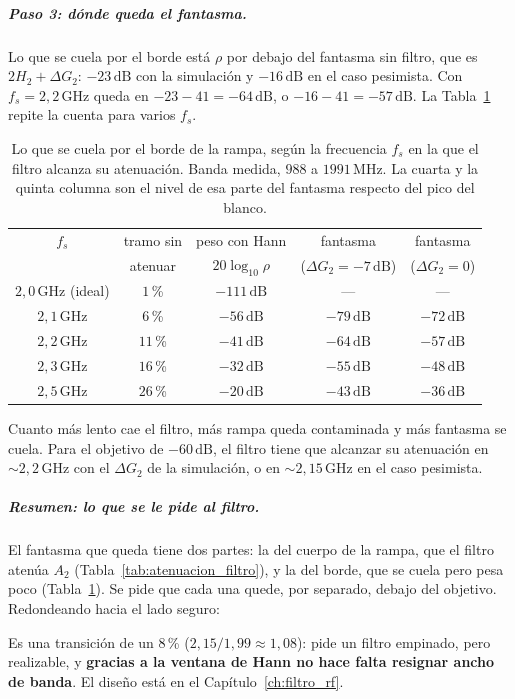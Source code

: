 \documentclass[12pt, a4paper, twoside]{report}
\begin{document}
\subparagraph{Paso 3: dónde queda el fantasma.} Lo que se cuela por el
borde está $\rho$ por debajo del fantasma sin filtro, que es $2H_2 + \Delta
G_2$: $-23\,\text{dB}$ con la simulación y $-16\,\text{dB}$ en el caso
pesimista. Con $f_s = 2{,}2\,\text{GHz}$ queda en
$-23 - 41 = -64\,\text{dB}$, o $-16 - 41 = -57\,\text{dB}$. La
Tabla~\ref{tab:filtro_transicion} repite la cuenta para varios $f_s$.

\begin{table}[H]
  \centering
  \caption{Lo que se cuela por el borde de la rampa, según la frecuencia
  $f_s$ en la que el filtro alcanza su atenuación. Banda medida, $988$ a
  $1991\,\text{MHz}$. La cuarta y la quinta columna son el nivel de esa parte
  del fantasma respecto del pico del blanco.}
  \label{tab:filtro_transicion}
  \begin{tabular}{ccccc}
    \toprule
    $f_s$ & tramo sin & peso con Hann & fantasma & fantasma \\
    & atenuar & $20\log_{10}\rho$ & ($\Delta G_2 = -7\,\text{dB}$)
      & ($\Delta G_2 = 0$) \\
    \midrule
    $2{,}0\,\text{GHz}$ (ideal) & $1$\,\% & $-111\,\text{dB}$ & ---
      & --- \\
    $2{,}1\,\text{GHz}$ & $6$\,\%  & $-56\,\text{dB}$ & $-79\,\text{dB}$
      & $-72\,\text{dB}$ \\
    $2{,}2\,\text{GHz}$ & $11$\,\% & $-41\,\text{dB}$ & $-64\,\text{dB}$
      & $-57\,\text{dB}$ \\
    $2{,}3\,\text{GHz}$ & $16$\,\% & $-32\,\text{dB}$ & $-55\,\text{dB}$
      & $-48\,\text{dB}$ \\
    $2{,}5\,\text{GHz}$ & $26$\,\% & $-20\,\text{dB}$ & $-43\,\text{dB}$
      & $-36\,\text{dB}$ \\
    \bottomrule
  \end{tabular}
\end{table}

Cuanto más lento cae el filtro, más rampa queda contaminada y más fantasma se
cuela. Para el objetivo de $-60\,\text{dB}$, el filtro tiene que alcanzar su
atenuación en $\sim\!2{,}2\,\text{GHz}$ con el $\Delta G_2$ de la
simulación, o en $\sim\!2{,}15\,\text{GHz}$ en el caso pesimista.

\subparagraph{Resumen: lo que se le pide al filtro.} El fantasma que queda
tiene dos partes: la del cuerpo de la rampa, que el filtro atenúa $A_2$
(Tabla~\ref{tab:atenuacion_filtro}), y la del borde, que se cuela pero pesa
poco (Tabla~\ref{tab:filtro_transicion}). Se pide que cada una quede, por
separado, debajo del objetivo. Redondeando hacia el lado seguro:
\begin{center}
\end{center}
Es una transición de un $8$\,\% ($2{,}15/1{,}99 \approx 1{,}08$): pide un
filtro empinado, pero realizable, y \textbf{gracias a la ventana de Hann no
hace falta resignar ancho de banda}. El diseño está en el
Capítulo~\ref{ch:filtro_rf}.
\end{document}
